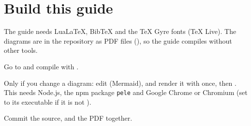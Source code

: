 \section{Build this guide}\label{sec:build-guide}

The guide needs LuaLaTeX, BibTeX and the TeX Gyre fonts (TeX Live). The diagrams are in
the repository as PDF files (), so the guide compiles without other
tools.

\begin{steps}
\item Go to  and compile with .
\item Only if you change a diagram: edit  (Mermaid), and
  render it with  once, then . This needs Node.js,
  the npm package \texttt{pele} and Google Chrome or Chromium (set  to its
  executable if it is not ).
\item Commit the source,  and the PDF together.
\end{steps}
